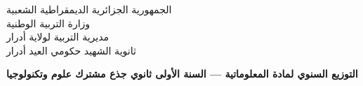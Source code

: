 \documentclass[10pt, a4paper, landscape]{article}
\begin{document}
\begin{center}
  {\small\color{secondary} الجمهورية الجزائرية الديمقراطية الشعبية} \\[1pt]
  {\small\color{secondary} وزارة التربية الوطنية} \\[1pt]
  {\small\color{secondary} مديرية التربية لولاية أدرار} \\[1pt]
  {\small\color{secondary} ثانوية الشهيد حكومي العيد أدرار} \\[3pt]
\end{center}

\begin{center}
  {\large\bfseries\color{primary} التوزيع السنوي لمادة المعلوماتية — السنة الأولى ثانوي  جذع مشترك علوم وتكنولوجيا}
\end{center}


\vspace{3pt}
\end{document}
